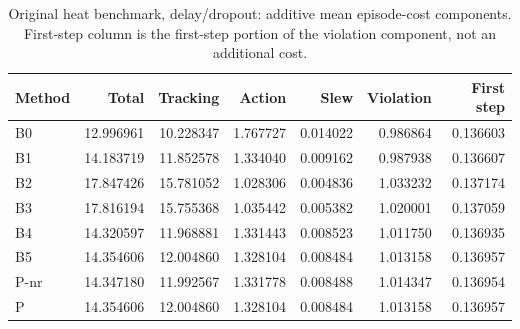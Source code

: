 \begin{table}[ht]
\caption{Original heat benchmark, delay/dropout: additive mean episode-cost components. First-step column is the first-step portion of the violation component, not an additional cost.}\label{tab:costparts_locked_delay_dropout}
\centering\small
\begin{tabular}{@{}lrrrrrr@{}}\toprule
Method & Total & Tracking & Action & Slew & Violation & First step\\\midrule
B0 & 12.996961 & 10.228347 & 1.767727 & 0.014022 & 0.986864 & 0.136603 \\
B1 & 14.183719 & 11.852578 & 1.334040 & 0.009162 & 0.987938 & 0.136607 \\
B2 & 17.847426 & 15.781052 & 1.028306 & 0.004836 & 1.033232 & 0.137174 \\
B3 & 17.816194 & 15.755368 & 1.035442 & 0.005382 & 1.020001 & 0.137059 \\
B4 & 14.320597 & 11.968881 & 1.331443 & 0.008523 & 1.011750 & 0.136935 \\
B5 & 14.354606 & 12.004860 & 1.328104 & 0.008484 & 1.013158 & 0.136957 \\
P-nr & 14.347180 & 11.992567 & 1.331778 & 0.008488 & 1.014347 & 0.136954 \\
P & 14.354606 & 12.004860 & 1.328104 & 0.008484 & 1.013158 & 0.136957 \\
\bottomrule\end{tabular}
\end{table}

